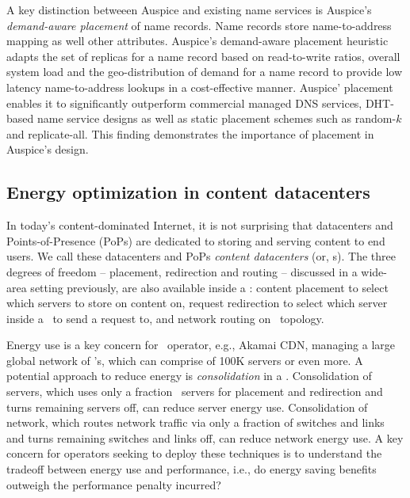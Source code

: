 A key distinction betweeen Auspice and existing name services is Auspice's \emph{demand-aware placement} of name records. Name records store name-to-address mapping as well other attributes. Auspice's demand-aware placement heuristic adapts the set of replicas for a name record based on read-to-write ratios, overall system load and the geo-distribution of demand for a name record to provide low latency name-to-address lookups in a cost-effective manner. Auspice' placement enables it to significantly outperform commercial managed DNS services, DHT-based name service designs as well as static placement schemes such as random-$k$ and replicate-all. This finding demonstrates the importance of placement in Auspice's design.


\subsection{Energy optimization in content datacenters}
\label{sec:intro-cdc}

In today's content-dominated Internet, it is not surprising that datacenters and Points-of-Presence (PoPs) are dedicated to storing and serving content to end users. We call these datacenters and PoPs {\em content datacenters} (or, \cdc s). The three degrees of freedom -- placement, redirection and routing -- discussed in a wide-area setting previously, are also available inside a \cdc: content placement to select which servers to store on content on, request redirection to select which server inside a \cdc\ to send a request to, and network routing on \cdc\ topology. 

Energy use is a key concern for \cdc\ operator, e.g., Akamai CDN, managing a large global network of \cdc's, which can comprise of 100K servers or even more. A potential approach to reduce energy is \emph{consolidation} in a \cdc. Consolidation of servers, which uses only a fraction \cdc\ servers for placement and redirection and turns remaining servers off, can reduce server energy use. Consolidation of network, which routes network traffic via only a fraction of switches and links and turns remaining switches and links off, can reduce network energy use. A key concern for operators seeking to deploy these techniques is to understand the tradeoff between energy use and performance, i.e., do energy saving benefits outweigh the performance penalty incurred?

